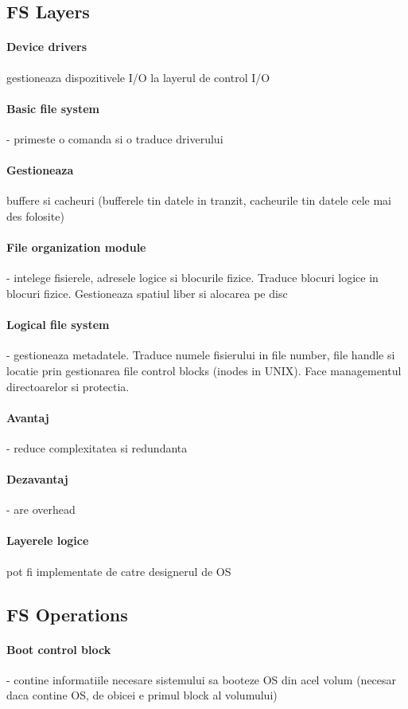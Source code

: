 \documentclass{article}
\begin{document}
\subsection*{FS Layers}
\paragraph*{Device drivers} gestioneaza dispozitivele I/O la layerul de control I/O
\paragraph*{Basic file system} - primeste o comanda si o traduce driverului
\paragraph*{Gestioneaza} buffere si cacheuri (bufferele tin datele in tranzit, cacheurile tin datele cele mai des folosite)
\paragraph*{File organization module} - intelege fisierele, adresele logice si blocurile fizice. Traduce blocuri logice in blocuri fizice. Gestioneaza spatiul liber si alocarea pe disc
\paragraph*{Logical file system} - gestioneaza metadatele. Traduce numele fisierului in file number, file handle si locatie prin gestionarea file control blocks (inodes in UNIX). Face managementul directoarelor si protectia.
\paragraph*{Avantaj} - reduce complexitatea si redundanta
\paragraph*{Dezavantaj} - are overhead
\paragraph*{Layerele logice} pot fi implementate de catre designerul de OS

\subsection*{FS Operations}
\paragraph*{Boot control block} - contine informatiile necesare sistemului sa booteze OS din acel volum (necesar daca contine OS, de obicei e primul block al volumului)
\end{document}
